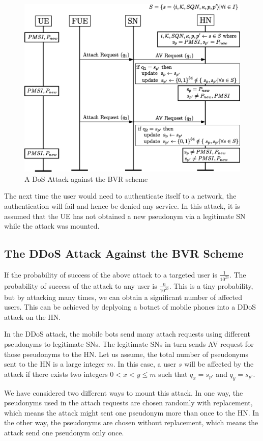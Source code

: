 \documentclass{llncs} %
\begin{document}
\begin{figure}[]
  \centering
    \includegraphics[width=.9\textwidth]{DDoS.eps}
  \caption{A DoS Attack against the BVR scheme}
  \label{fig:dos_attack}	
\end{figure}

The next time the user would need to authenticate itself to a network, the authentication will fail and hence be denied any service. In this attack, it is assumed that the UE has not obtained a new pseudonym via a legitimate SN while the attack was mounted.

\subsection{The DDoS Attack Against the BVR Scheme} \label{sec:ddos_attack}
If the probability of success of the above attack to a targeted user is $\frac{1}{10^{20}}$. The probability of success of the attack to any user is $\frac{n}{10^{20}}$. This is a tiny probability, but by attacking many times, we can obtain a significant number of affected users. This can be achieved by deplyoing a botnet of mobile phones into a DDoS attack on the HN.

In the DDoS attack, the mobile bots send many attach requests using different pseudonyms to legitimate SNs. The legitimate SNs in turn sends AV request for those pseudonyms to the HN. Let us assume, the total number of pseudonyms sent to the HN is a large integer $m$. In this case, a user $s$ will be affected by the attack if there exists two integers $0 < x < y \leq m$ such that $q_{x} = s_{p'}$ and $q_{y} = s_{p'}$. 

We have considered two different ways to mount this attack. In one way, the pseudonyms used in the attach requests are chosen randomly with replacement, which means the attack might sent one pseudonym more than once to the HN. In the other way, the pseudonyms are chosen without replacement, which means the attack send one pseudonym only once.
\end{document}
